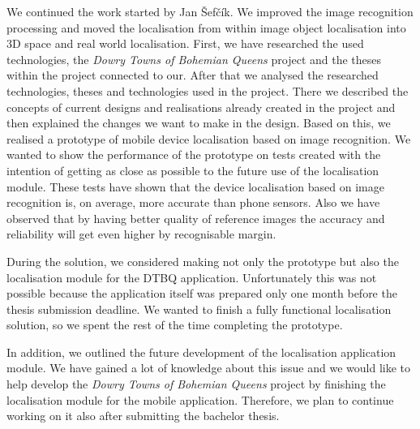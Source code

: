 \documentclass[thesis=B,english]{FITthesis}[2019/12/23]
\begin{document}
\begin{conclusion}
    We continued the work started by Jan Šefčík. We improved the image recognition processing and moved the localisation from within image object localisation into 3D space and real world localisation. First, we have researched the used technologies, the \textit{Dowry Towns of Bohemian Queens} project and the theses within the project connected to our. After that we analysed the researched technologies, theses and technologies used in the project. There we described the concepts of current designs and realisations already created in the project and then explained the changes we want to make in the design. Based on this, we realised a prototype of mobile device localisation based on image recognition. We wanted to show the performance of the prototype on tests created with the intention of getting as close as possible to the future use of the localisation module. These tests have shown that the device localisation based on image recognition is, on average, more accurate than phone sensors. Also we have observed that by having better quality of reference images the accuracy and reliability will get even higher by recognisable margin.
    
During the solution, we considered making not only the prototype but also the localisation module for the DTBQ application. Unfortunately this was not possible because the application itself was prepared only one month before the thesis submission deadline. We wanted to finish a fully functional localisation solution, so we spent the rest of the time completing the prototype.
    
    In addition, we outlined the future development of the localisation application module.
We have gained a lot of knowledge about this issue and we would like to help develop the \textit{Dowry Towns of Bohemian Queens} project by finishing the localisation module for the mobile application. Therefore, we plan to continue working on it also after submitting the bachelor thesis.
\end{conclusion}
 
    

\printbibliography[title={Bibliography}]

%
%

\appendix
\end{document}
